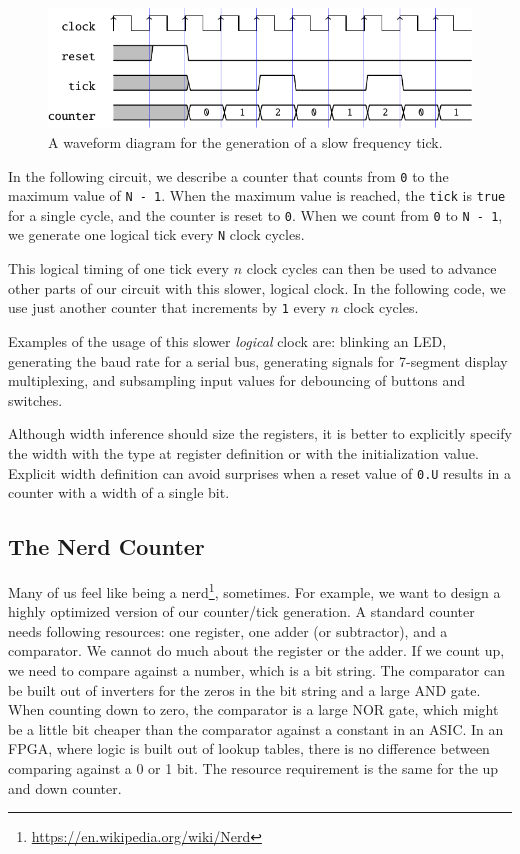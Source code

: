 \documentclass[%
    10pt,
    headinclude, footexclude,
    openright, %
    notitlepage,
    cleardoubleempty,
    headsepline,
    pointlessnumbers,
    bibtotoc, idxtotoc,
    ]{scrbook}
\newcommand{\code}[1]{{\small{\texttt{#1}}}}
\newcommand{\myref}[2]{\href{#1}{#2}}
\renewcommand{\myref}[2]{{#2}{\footnote{\url{#1}}}}
\begin{document}
\begin{figure}
  \centering
  \includegraphics[scale=1]{figures/tick_wave}
  \caption{A waveform diagram for the generation of a slow frequency tick.}
  \label{fig:tick-wave}
\end{figure}


In the following circuit, we describe a counter that counts from \code{0}
to the maximum value of \code{N - 1}. When the maximum value is reached,
the \code{tick} is \code{true} for a single cycle, and the counter is reset to \code{0}.
When we count from \code{0} to \code{N - 1}, we generate one logical tick
every \code{N} clock cycles.


\noindent This logical timing of one tick every $n$ clock cycles can then be used
to advance other parts of our circuit with this slower, logical clock.
In the following code, we use just another counter that increments by \code{1}
every $n$ clock cycles.


Examples of the usage of this slower \emph{logical} clock are: blinking an LED,
generating the baud rate for a serial bus, generating signals for 7-segment
display multiplexing, and subsampling input values for debouncing of buttons
and switches. 


Although width inference should size the registers, it is better to explicitly
specify the width with the type at register definition or with the
initialization value. Explicit width definition can avoid surprises when a reset value of \code{0.U}
results in a counter with a width of a single bit.

\subsection{The Nerd Counter}

Many of us feel like being a \myref{https://en.wikipedia.org/wiki/Nerd}{nerd}, sometimes.
For example, we want to design a highly optimized version of our counter/tick generation.
A standard counter needs following resources: one register, one adder (or subtractor),
and a comparator. We cannot do much about the register or the adder. If we count
up, we need to compare against a number, which is a bit string. The comparator
can be built out of inverters for the zeros in the bit string and a large AND gate.
When counting down to zero, the comparator is a large NOR gate, which might be
a little bit cheaper than the comparator against a constant in an ASIC.
In an FPGA, where logic is built out of lookup tables, there is no difference between comparing
against a 0 or 1 bit. The resource requirement is the same for the up and down counter.
\end{document}
